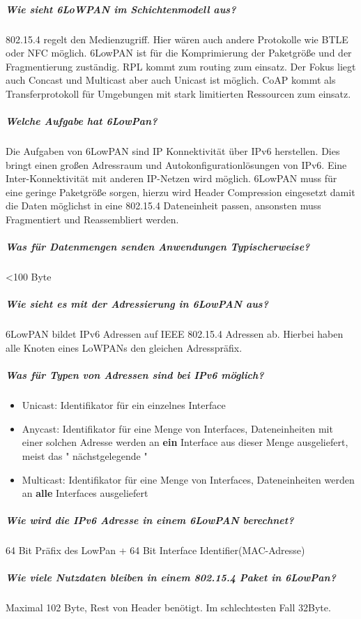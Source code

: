 	\subparagraph{Wie sieht 6LoWPAN im Schichtenmodell aus?}
	802.15.4  regelt den Medienzugriff. Hier wären auch andere Protokolle wie BTLE oder NFC möglich.
	6LowPAN ist für die Komprimierung der Paketgröße und der Fragmentierung zuständig.
	RPL kommt zum routing zum einsatz. Der Fokus liegt auch Concast und Multicast aber auch Unicast ist möglich.
	CoAP kommt als Transferprotokoll für Umgebungen mit stark limitierten Ressourcen zum einsatz.
	\begin{figure}[H]
		\centering
		
		
	\end{figure}
	
	\subparagraph{Welche Aufgabe hat 6LowPan?}
	Die Aufgaben von 6LowPAN sind IP Konnektivität über IPv6 herstellen. Dies bringt einen großen Adressraum und Autokonfigurationlösungen von IPv6. Eine Inter-Konnektivität mit anderen IP-Netzen wird möglich.
	6LowPAN muss für eine geringe Paketgröße sorgen, hierzu wird Header Compression eingesetzt damit die Daten möglichst in eine 802.15.4 Dateneinheit passen, ansonsten muss Fragmentiert und Reassembliert werden.
	
	\subparagraph{Was für Datenmengen senden Anwendungen Typischerweise?}
	<100 Byte
	
	\subparagraph{Wie sieht es mit der Adressierung in 6LowPAN aus?}
	6LowPAN bildet IPv6 Adressen auf IEEE 802.15.4 Adressen ab. Hierbei haben alle Knoten eines LoWPANs den gleichen Adresspräfix. 
	
	\subparagraph{Was für Typen von Adressen sind bei IPv6 möglich?}
	\begin{itemize}
		\item Unicast: Identifikator für ein einzelnes Interface
		\item Anycast: Identifikator für eine Menge von Interfaces, Dateneinheiten mit einer solchen Adresse werden an \textbf{ein} Interface aus dieser Menge ausgeliefert, meist das " nächstgelegende "
		\item Multicast: Identifikator für eine Menge von Interfaces, Dateneinheiten werden an \textbf{alle} Interfaces ausgeliefert
	\end{itemize}
	
	
	\subparagraph{Wie wird die IPv6 Adresse in einem 6LowPAN berechnet?}
	64 Bit Präfix des LowPan + 64 Bit Interface Identifier(MAC-Adresse)
	
	\subparagraph{Wie viele Nutzdaten bleiben in einem 802.15.4 Paket in 6LowPan?}
	Maximal 102 Byte, Rest von Header benötigt. Im schlechtesten Fall 32Byte.
	
